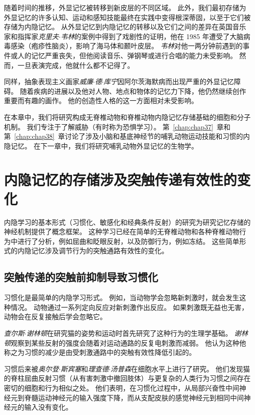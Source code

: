 随着时间的推移，外显记忆被转移到新皮层的不同区域。
此外，我们最初存储为外显记忆的许多认知、运动和感知技能最终在实践中变得根深蒂固，以至于它们被存储为内隐记忆。
从外显记忆到内隐记忆的转移以及它们之间的差异在英国音乐家和指挥家\textit{克里夫$\cdot$韦林}的案例中得到了戏剧性的证明，他在 1985 年遭受了大脑病毒感染（疱疹性脑炎），影响了海马体和颞叶皮层。
\textit{韦林}对他一两分钟前遇到的事件或人的记忆严重丧失，但他阅读音乐、弹钢琴或进行合唱的能力未受影响。
然而，一旦表演完成，他就什么都不记得了。


同样，抽象表现主义画家\textit{威廉$\cdot$德$\cdot$库宁}因阿尔茨海默病而出现严重的外显记忆障碍。
随着疾病的进展以及他对人物、地点和物体的记忆力下降，他仍然继续创作重要而有趣的画作。
他的创造性人格的这一方面相对未受影响。


在本章中，我们将研究构成无脊椎动物和脊椎动物内隐记忆存储基础的细胞和分子机制。
我们专注于了解威胁（有时称为恐惧学习）。
第~\ref{chap:chap37}~章和第~\ref{chap:chap38}~章讨论了涉及小脑和基底神经节的哺乳动物运动技能和习惯的内隐记忆。
在下一章中，我们将研究哺乳动物外显记忆的生物学。



\section{内隐记忆的存储涉及突触传递有效性的变化}

内隐学习的基本形式（习惯化、敏感化和经典条件反射）的研究为研究记忆存储的神经机制提供了概念框架。
这种学习已经在简单的无脊椎动物和各种脊椎动物行为中进行了分析，例如屈曲和眨眼反射，以及防御行为，例如冻结。
这些简单形式的内隐记忆涉及调节行为的突触通路有效性的变化。



\subsection{突触传递的突触前抑制导致习惯化}

习惯化是最简单的内隐学习形式。
例如，当动物学会忽略新刺激时，就会发生这种情况。
动物通过一系列定向反应对新刺激作出反应。
如果刺激既无益也无害，动物会在反复接触后学会忽略它。


\textit{查尔斯$\cdot$谢林顿}在研究猫的姿势和运动时首先研究了这种行为的生理学基础。
\textit{谢林顿}观察到某些反射的强度会随着对运动通路的反复电刺激而减弱。
他认为这种他称之为习惯的减少是由受刺激通路中的突触有效性降低引起的。


习惯后来被\textit{奥尔登$\cdot$斯宾塞}和\textit{理查德$\cdot$汤普森}在细胞水平上进行了研究。
他们发现猫的脊柱屈曲反射习惯（从有害刺激中撤回肢体）与更复杂的人类行为习惯之间存在密切的细胞和行为相似之处。
他们表明，在习惯化过程中，从局部兴奋性中间神经元到脊髓运动神经元的输入强度下降，而从支配皮肤的感觉神经元到相同中间神经元的输入没有变化。


